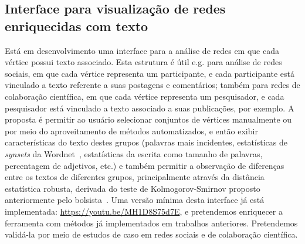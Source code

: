 \documentclass[a4paper, 11pt]{article}
\begin{document}
\subsection{Interface para visualização de redes enriquecidas com texto}
Está em desenvolvimento uma interface para a análise de redes em que cada vértice possui texto associado.
Esta estrutura é útil e.g. para análise de redes sociais, em que cada vértice representa um participante, e cada participante está vinculado a texto referente a suas postagens e comentários;
também para redes de colaboração científica, em que cada vértice representa um pesquisador, e cada pesquisador está vinculado a texto associado a suas publicações, por exemplo.
A proposta  é permitir ao usuário selecionar conjuntos de vértices manualmente ou por meio  do aproveitamento de métodos automatizados,
e então exibir características do texto destes grupos (palavras mais incidentes,
estatísticas de \emph{synsets} da Wordnet~\cite{wn}, estatísticas da escrita como tamanho de palavras, percentagem de adjetivos, etc.) e também permitir a observação de diferenças
entre os textos de diferentes grupos, principalmente através da distância estatística robusta, derivada do teste de Kolmogorov-Smirnov proposto anteriormente pelo bolsista~\cite{ks}.
Uma versão mínima desta interface já está implementada: \url{https://youtu.be/MH1D8S75d7E}, e pretendemos enriquecer a ferramenta com métodos já implementados em trabalhos anteriores. Pretendemos validá-la por meio de estudos de caso em redes sociais e de colaboração científica.
\end{document}
